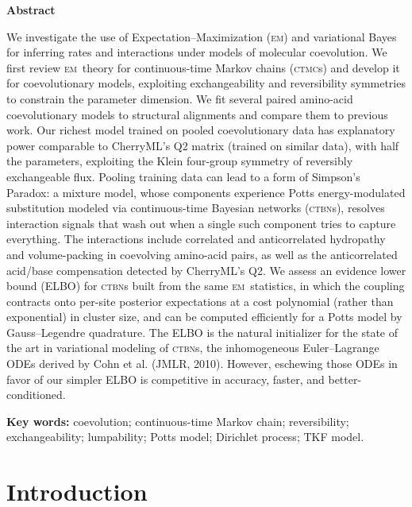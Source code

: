 \documentclass[11pt]{article}
\newcommand{\CTBN}{\textsc{ctbn}}
\newcommand{\CTMC}{\textsc{ctmc}}
\newcommand{\EM}{\textsc{em}}
\begin{document}
\begin{singlespace}
\noindent\textbf{Abstract}

\noindent We investigate the use of Expectation--Maximization (\EM) and variational Bayes for inferring rates and interactions under
models of molecular coevolution.
We first review \EM\ theory for continuous-time Markov chains (\CTMC s) and develop it for coevolutionary models,
exploiting exchangeability and reversibility symmetries to constrain the parameter dimension.
We fit several paired amino-acid coevolutionary models to structural alignments
and compare them to previous work.
Our richest model trained on pooled coevolutionary data has explanatory power comparable to CherryML's Q2 matrix (trained on similar data), with half the parameters,
exploiting the Klein four-group symmetry of reversibly exchangeable flux.
Pooling training data can lead to a form of Simpson's Paradox: a mixture model,
whose components experience Potts energy-modulated substitution modeled via continuous-time Bayesian networks (\CTBN s),
resolves interaction signals that wash out when a single such component tries to capture everything.
The interactions include correlated and anticorrelated hydropathy and volume-packing in coevolving amino-acid pairs,
as well as the anticorrelated acid/base compensation detected by CherryML's Q2.
We assess an evidence lower bound (ELBO) for \CTBN s built from the same \EM\ statistics, in which the coupling
contracts onto per-site posterior expectations at a cost polynomial (rather than exponential) in cluster size,
and can be computed efficiently for a Potts model by Gauss--Legendre quadrature.
The ELBO is the natural initializer for the state of the art in variational modeling of \CTBN s,
the inhomogeneous Euler--Lagrange ODEs derived by Cohn et al. (JMLR, 2010).
However, eschewing those ODEs in favor of our simpler ELBO
is competitive in accuracy, faster, and better-conditioned.

\vspace{1em}
\noindent\textbf{Key words:} coevolution; continuous-time Markov chain; reversibility; exchangeability; lumpability; Potts model; Dirichlet process; TKF model.
\end{singlespace}

\newpage
\section{Introduction}
\label{sec:intro}
\end{document}
